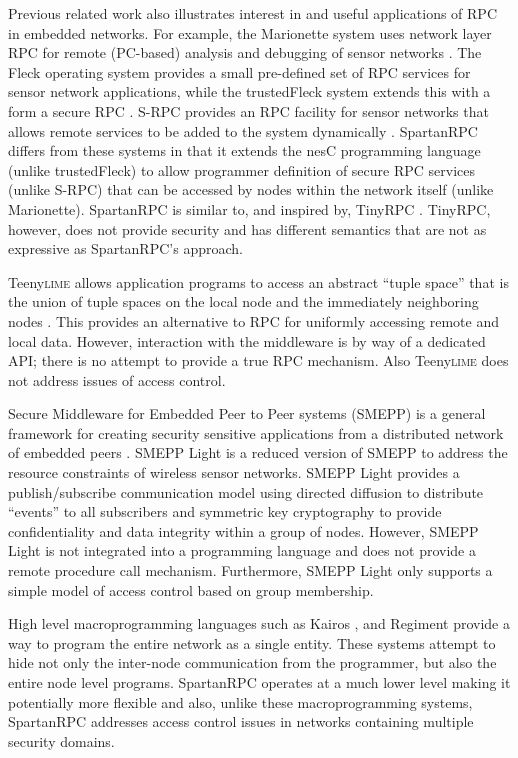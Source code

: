 Previous related work also illustrates interest in and useful applications of RPC in embedded
networks. For example, the Marionette system uses network layer RPC for remote (PC-based)
analysis and debugging of sensor networks \cite{whitehouse-marionette-2006}. The Fleck operating
system provides a small pre-defined set of RPC services for sensor network applications, while
the trustedFleck system extends this with a form a secure RPC
\cite{hu-secfleck-2009,Hu:2010:TTW:1806895.1806900}. S-RPC provides an RPC facility for sensor
networks that allows remote services to be added to the system dynamically \cite{5766863}.
SpartanRPC differs from these systems in that it extends the nesC programming language (unlike
trustedFleck) to allow programmer definition of secure RPC services (unlike S-RPC) that can be
accessed by nodes within the network itself (unlike Marionette). SpartanRPC is similar to, and
inspired by, TinyRPC \cite{may-tinyrpc-2007}. TinyRPC, however, does not provide security and
has different semantics that are not as expressive as SpartanRPC's approach.

Teeny\textsc{lime} allows application programs to access an abstract ``tuple space'' that is the
union of tuple spaces on the local node and the immediately neighboring nodes
\cite{Costa:2007:PWS:1516124.1516153}. This provides an alternative to RPC for uniformly
accessing remote and local data. However, interaction with the middleware is by way of a
dedicated API; there is no attempt to provide a true RPC mechanism. Also Teeny\textsc{lime} does
not address issues of access control.

Secure Middleware for Embedded Peer to Peer systems (SMEPP) is a general framework for creating
security sensitive applications from a distributed network of embedded peers
\cite{Brogi:2008:SME:1363370.1363548}. SMEPP Light \cite{Vairo:2008:SMW:1594978.1595054} is a
reduced version of SMEPP to address the resource constraints of wireless sensor networks. SMEPP
Light provides a publish/subscribe communication model using directed diffusion
\cite{intanagonwiwat-2003} to distribute ``events'' to all subscribers and symmetric key
cryptography to provide confidentiality and data integrity within a group of nodes. However,
SMEPP Light is not integrated into a programming language and does not provide a remote
procedure call mechanism. Furthermore, SMEPP Light only supports a simple model of access
control based on group membership.

High level macro\-programming languages such as Kairos \cite{springerlink:10.1007/1150259312},
and Regiment \cite{Newton:2007:RMS:1236360.1236422} provide a way to program the entire network
as a single entity. These systems attempt to hide not only the inter-node communication from the
programmer, but also the entire node level programs. SpartanRPC operates at a much lower level
making it potentially more flexible and also, unlike these macro\-programming systems,
SpartanRPC addresses access control issues in networks containing multiple security domains.

